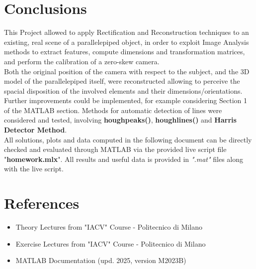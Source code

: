 \documentclass{Configuration_Files/PoliMi3i_thesis}
\begin{document}
\chapter{Conclusions}
This Project allowed to apply Rectification and Reconstruction techniques to an existing, real scene of a parallelepiped object, in order to exploit Image Analysis methods to extract features, compute dimensions and transformation matrices, and perform the calibration of a zero-skew camera.\\
Both the original position of the camera with respect to the subject, and the 3D model of the parallelepiped itself, were reconstructed allowing to perceive the spacial disposition of the involved elements and their dimensions/orientations.
Further improvements could be implemented, for example considering Section 1 of the MATLAB section. Methods for automatic detection of lines were considered and tested, involving \textbf{houghpeaks()}, \textbf{houghlines()} and \textbf{Harris Detector Method}.\\
All solutions, plots and data computed in the following document can be directly checked and evaluated through MATLAB via the provided live script file "\textbf{homework.mlx}". All results and useful data is provided in \textit{".mat"} files along with the live script.


\cleardoublepage
{} %
\appendix
\chapter{References}
\begin{itemize}
    \item Theory Lectures from "IACV" Course - Politecnico di Milano
    \item Exercise Lectures from "IACV" Course - Politecnico di Milano
    \item MATLAB Documentation (upd. 2025, version M2023B)
\end{itemize}



\cleardoublepage
\end{document}
